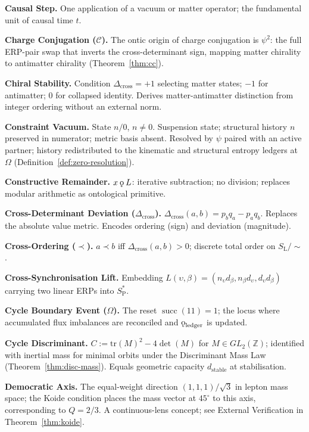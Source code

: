 \documentclass[11pt, letterpaper]{article}
\newcommand{\Z}{\mathbb{Z}}
\newcommand{\SL}{S_{\mathrm{L}}}
\newcommand{\SPs}{S_{\mathrm{P}}^{*}}
\renewcommand{\succ}{\operatorname{succ}}
\newcommand{\Dcross}{\Delta_{\mathrm{cross}}}
\newcommand{\koppa}{\mathbin{\text{\rm\k{o}}}}
\theoremstyle{definition}
\theoremstyle{plain}
\begin{document}
\medskip\noindent\textbf{Causal Step.}
One application of a vacuum or matter operator; the fundamental unit of
causal time $t$.

\medskip\noindent\textbf{Charge Conjugation ($\mathcal{C}$).}
The ontic origin of charge conjugation is $\psi^2$: the full ERP-pair swap
that inverts the cross-determinant sign, mapping matter chirality to
antimatter chirality (Theorem~\ref{thm:cc}).

\medskip\noindent\textbf{Chiral Stability.}
Condition $\Dcross=+1$ selecting matter states; $-1$ for antimatter; $0$ for
collapsed identity.  Derives matter-antimatter distinction from integer
ordering without an external norm.


\medskip\noindent\textbf{Constraint Vacuum.}
State $n/0$, $n\neq 0$.  Suspension state; structural history $n$ preserved
in numerator; metric basis absent.  Resolved by $\psi$ paired with an active
partner; history redistributed to the kinematic and structural entropy
ledgers at $\Omega$ (Definition~\ref{def:zero-resolution}).

\medskip\noindent\textbf{Constructive Remainder.}
$x\koppa L$: iterative subtraction; no division; replaces modular arithmetic
as ontological primitive.

\medskip\noindent\textbf{Cross-Determinant Deviation ($\Dcross$).}
$\Dcross(a,b)=p_b q_a-p_a q_b$.  Replaces the absolute value metric.
Encodes ordering (sign) and deviation (magnitude).

\medskip\noindent\textbf{Cross-Ordering ($\prec$).}
$a\prec b$ iff $\Dcross(a,b)>0$; discrete total order on $\SL/{\sim}$.

\medskip\noindent\textbf{Cross-Synchronisation Lift.}
Embedding $L(\upsilon,\beta)=(n_\upsilon d_\beta,n_\beta d_\upsilon,
d_\upsilon d_\beta)$ carrying two linear ERPs into $\SPs$.

\medskip\noindent\textbf{Cycle Boundary Event ($\Omega$).}
The reset $\succ(11)=1$; the locus where accumulated flux imbalances are
reconciled and $\koppa_{\mathrm{ledger}}$ is updated.

\medskip\noindent\textbf{Cycle Discriminant.}
$C:=\mathrm{tr}(M)^2-4\det(M)$ for $M\in GL_2(\Z)$; identified with
inertial mass for minimal orbits under the Discriminant Mass Law
(Theorem~\ref{thm:disc-mass}).  Equals geometric capacity $d_{\mathrm{stable}}$
at stabilisation.

\medskip\noindent\textbf{Democratic Axis.}
The equal-weight direction $(1,1,1)/\sqrt{3}$ in lepton mass space; the
Koide condition places the mass vector at $45^\circ$ to this axis,
corresponding to $Q=2/3$.  A continuous-lens concept; see External
Verification in Theorem~\ref{thm:koide}.
\end{document}
